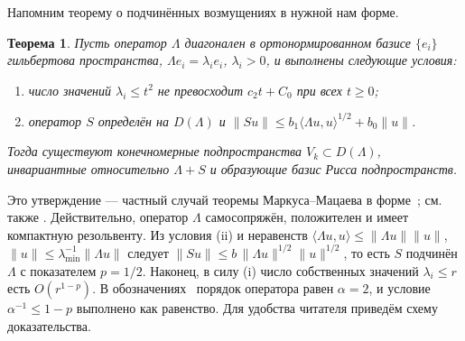 \documentclass[12pt,a4paper]{article}
\newtheorem{theorem}{Теорема}
\theoremstyle{definition}
\newcommand{\norm}[1]{\lVert#1\rVert}
\newcommand{\inner}[2]{\langle#1,#2\rangle}
\begin{document}
Напомним теорему о подчинённых возмущениях в нужной нам форме.
\begin{theorem}\label{th:mm}
Пусть оператор $\Lambda$ диагонален в ортонормированном базисе $\{e_i\}$ гильбертова
пространства, $\Lambda e_i=\lambda_ie_i$, $\lambda_i>0$, и выполнены следующие условия:
\begin{enumerate}
\item[(i)] число значений $\lambda_i\le t^2$ не превосходит $c_2t+C_0$ при всех $t\ge0$;
\item[(ii)] оператор $S$ определён на $D(\Lambda)$ и
$\norm{Su}\le b_1\inner{\Lambda u}{u}^{1/2}+b_0\norm u$.
\end{enumerate}
Тогда существуют конечномерные подпространства $V_k\subset D(\Lambda)$, инвариантные
относительно $\Lambda+S$ и образующие базис Рисса подпространств.
\end{theorem}
Это утверждение --- частный случай теоремы Маркуса--Мацаева в
форме~\cite[теорема~6.1]{Wyss}; см. также \cite[теорема~6.6]{Shk}. Действительно,
оператор $\Lambda$ самосопряжён, положителен и имеет компактную резольвенту. Из условия
(ii) и неравенств $\inner{\Lambda u}{u}\le\norm{\Lambda u}\norm u$,
$\norm u\le\lambda_{\min}^{-1}\norm{\Lambda u}$ следует
$\norm{Su}\le b\,\norm{\Lambda u}^{1/2}\norm u^{1/2}$, то есть $S$ подчинён $\Lambda$ с
показателем $p=1/2$. Наконец, в силу (i) число собственных значений $\lambda_i\le r$ есть
$O(r^{1-p})$. В обозначениях~\cite{Shk} порядок оператора равен $\alpha=2$, и условие
$\alpha^{-1}\le1-p$ выполнено как равенство. Для удобства читателя приведём схему
доказательства.
\end{document}
